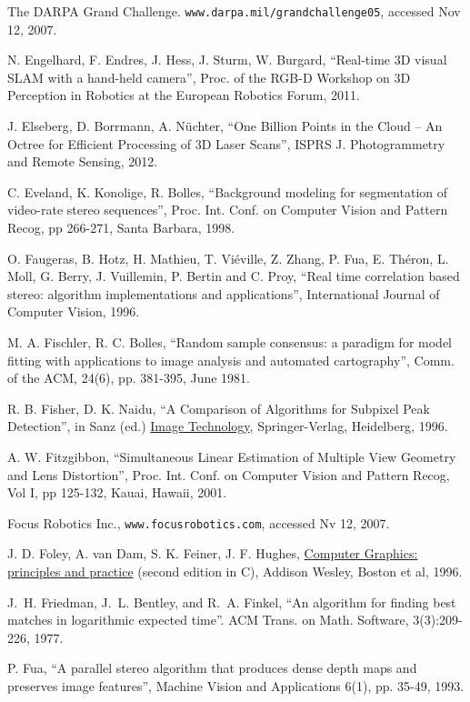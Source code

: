 \documentclass[twocolumn,oneside]{book}
\begin{document}
\begin{thebibliography}{99}
The DARPA Grand Challenge.
\verb+www.darpa.mil/grandchallenge05+, accessed Nov 12, 2007.

N. Engelhard, F. Endres, J. Hess, J. Sturm, W. Burgard,
``Real-time 3D visual SLAM with a hand-held camera'',
Proc. of the RGB-D Workshop on 3D Perception in Robotics at the
European Robotics Forum, 2011.

J. Elseberg, D. Borrmann, A. N{\"u}chter,
``One Billion Points in the Cloud -- An Octree for Efficient Processing of 3D Laser Scans'',
ISPRS J. Photogrammetry and Remote Sensing, 2012.

C. Eveland, K. Konolige, R. Bolles,
``Background modeling for segmentation of video-rate stereo sequences'',
Proc. Int. Conf. on Computer Vision and Pattern Recog, pp 266-271, Santa Barbara, 1998.

O. Faugeras, B. Hotz, H. Mathieu, T. Vi\'eville, Z. Zhang, P. Fua,
E. Th\'eron, L. Moll, G. Berry, J. Vuillemin, P. Bertin and C. Proy,
``Real time correlation based stereo: algorithm implementations and applications'',
International Journal of Computer Vision, 1996.

M. A. Fischler, R. C. Bolles,
``Random sample consensus: a paradigm for model fitting with applications to
image analysis and automated cartography'',
Comm. of the ACM, 24(6), pp. 381-395, June 1981. 

R. B. Fisher, D. K. Naidu,  
``A Comparison of Algorithms for Subpixel Peak Detection'',
in Sanz (ed.) {\underline {Image Technology}},
Springer-Verlag, Heidelberg, 1996.

A. W. Fitzgibbon,
``Simultaneous Linear Estimation of Multiple View Geometry and Lens Distortion'',
Proc. Int. Conf. on Computer Vision and Pattern Recog, Vol I, pp 125-132, Kauai, Hawaii, 2001.

Focus Robotics Inc.,
\verb+www.focusrobotics.com+, accessed Nv 12, 2007.

J. D. Foley, A. van Dam, S. K. Feiner, J. F. Hughes,
{\underline{Computer Graphics: principles and practice}} (second edition in C),
Addison Wesley, Boston et al, 1996.

J.~H. Friedman, J.~L. Bentley, and R.~A. Finkel,
``An algorithm for finding best matches in logarithmic expected time''.
ACM Trans. on Math. Software, 3(3):209-226, 1977.

P. Fua,
``A parallel stereo algorithm that produces dense depth maps and preserves image features'',
Machine Vision and Applications 6(1), pp. 35-49, 1993.


\end{thebibliography}
\end{document}
